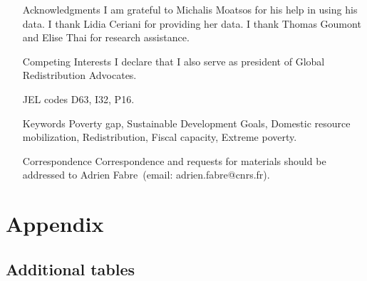 \clearpage
\listoftables
\listoffigures
\begin{itemize}
 \item[Acknowledgments] I am grateful to Michalis Moatsos for his help in using his data. I thank Lidia Ceriani for providing her data. I thank Thomas Goumont and Elise Thai for research assistance. 
 \item[Competing Interests] I declare that I also serve as president of Global Redistribution Advocates.
\item[JEL codes] D63, I32, P16.
\item[Keywords]  Poverty gap, Sustainable Development Goals, Domestic resource mobilization, Redistribution, Fiscal capacity, Extreme poverty.
 \item[Correspondence] Correspondence and requests for materials
should be addressed to Adrien Fabre~(email: adrien.fabre@cnrs.fr).\end{itemize}

\section{Appendix}

\subsection{Additional tables}






